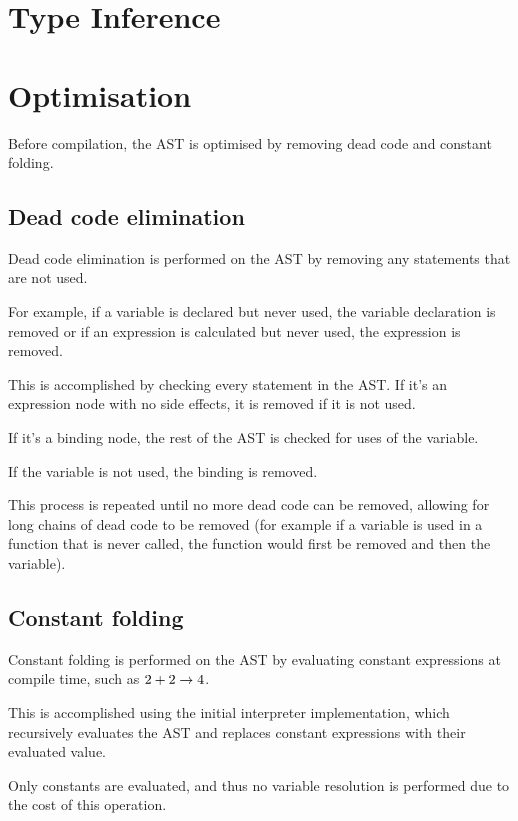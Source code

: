 \section{Type Inference}\label{sec:type-inference}


\section{Optimisation}\label{sec:optimisation}

Before compilation, the AST is optimised by removing dead code and constant folding.

\subsection{Dead code elimination}\label{subsec:dead-code-elimination}

Dead code elimination is performed on the AST by removing any statements that are not used.

For example, if a variable is declared but never used, the variable declaration is removed or if an expression is
calculated but never used, the expression is removed.

This is accomplished by checking every statement in the AST\@.
If it's an expression node with no side effects, it is removed if it is not used.

If it's a binding node, the rest of the AST is checked for uses of the variable.

If the variable is not used, the binding is removed.

This process is repeated until no more dead code can be removed, allowing for long chains of dead code to be 
removed (for example if a variable is used in a function that is never called, the function would first be removed
and then the variable).

\subsection{Constant folding}\label{subsec:constant-folding}

Constant folding is performed on the AST by evaluating constant expressions at compile time, such as $2 + 2 \rightarrow 4$.

This is accomplished using the initial interpreter implementation, which recursively evaluates the AST and replaces
constant expressions with their evaluated value.

Only constants are evaluated, and thus no variable resolution is performed due to the cost of this operation.

